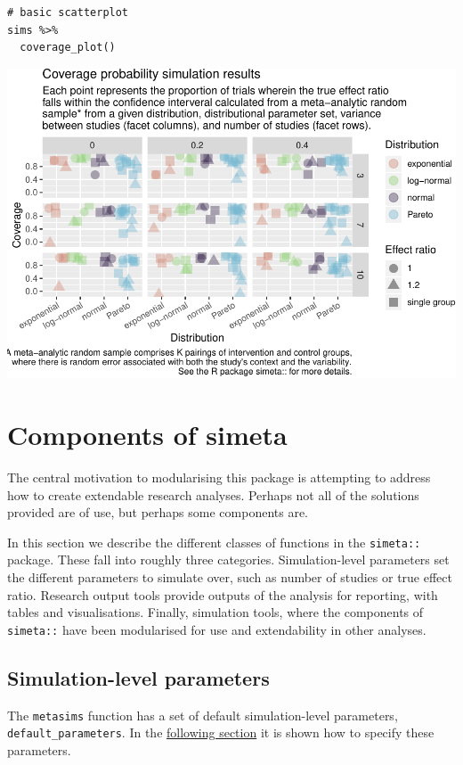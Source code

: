 \documentclass[
]{article}
\begin{document}
\begin{verbatim}
# basic scatterplot
sims %>% 
  coverage_plot()
\end{verbatim}

\includegraphics[width=\textwidth]{simeta-demo_files/figure-latex/coverage plot-1}

\hypertarget{components-of-simeta}{%
\section{Components of simeta}\label{components-of-simeta}}

The central motivation to modularising this package is attempting to
address how to create extendable research analyses. Perhaps not all of
the solutions provided are of use, but perhaps some components are.

In this section we describe the different classes of functions in the
\texttt{simeta::} package. These fall into roughly three categories.
Simulation-level parameters set the different parameters to simulate
over, such as number of studies or true effect ratio. Research output
tools provide outputs of the analysis for reporting, with tables and
visualisations. Finally, simulation tools, where the components of
\texttt{simeta::} have been modularised for use and extendability in
other analyses.

\hypertarget{simulation-level-parameters}{%
\subsection{Simulation-level
parameters}\label{simulation-level-parameters}}

The \texttt{metasims} function has a set of default simulation-level
parameters, \texttt{default\_parameters}. In the
\protect\hyperlink{specify-dist}{following section} it is shown how to
specify these parameters.
\end{document}

